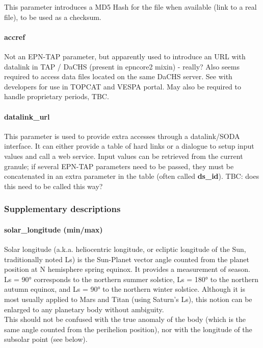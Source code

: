 \documentclass[11pt,a4paper]{ivoa}
\begin{document}
This parameter introduces a MD5 Hash for the file when available (link to a real file), to be used as a checksum.\\

\paragraph{accref}

Not an EPN-TAP parameter, but apparently used to introduce an URL with datalink in TAP / DaCHS (present in epncore2 mixin) - really? Also seems required to access data files located on the same DaCHS server. See with developers for use in TOPCAT and VESPA portal. May also be required to handle proprietary periods, TBC. \\

\paragraph{datalink\_url}

This parameter is used to provide extra accesses through a datalink/SODA interface. It can either provide a table of hard links or a dialogue to setup input values and call a web service. Input values can be retrieved from the current granule; if several EPN-TAP parameters need to be passed, they must be concatenated in an extra parameter in the table (often called \textbf{ds\_id}). TBC: does this need to be called this way?

\subsubsection{Supplementary descriptions\\}

\paragraph{solar\_longitude (min/max)}

Solar longitude (a.k.a. heliocentric longitude, or ecliptic longitude of the Sun, traditionally noted Ls) is the Sun-Planet vector angle counted from the planet position at N hemisphere spring equinox. It provides a measurement of season. \\ Ls = 90° corresponds to the northern summer solstice, Ls = 180° to the northern autumn equinox, and Ls = 90° to the northern winter solstice. Although it is most usually applied to Mars and Titan (using Saturn's Ls), this notion can be enlarged to any planetary body without ambiguity.\\ This should not be confused with the true anomaly of the body (which is the same angle counted from the perihelion position), nor with the longitude of the subsolar point (see below).
\end{document}
